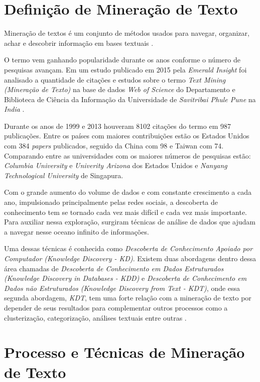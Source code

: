 \documentclass[conference]{IEEEtran}
\begin{document}
\section{Definição de Mineração de Texto}\label{definicao}

Mineração de textos é um conjunto de métodos
usados para navegar, organizar, achar e descobrir
informação em bases textuais \cite{art1}. 

O termo vem ganhando popularidade durante os anos conforme o número de pesquisas avançam.
Em um estudo publicado em 2015 pela \textit{Emerald Insight} foi analisado a quantidade de citações e estudos sobre o termo \textit{Text Mining (Mineração de Texto)} na base de dados \textit{Web of Science} do Departamento e Biblioteca de Ciência da Informação da Universidade de \textit{Savitribai Phule Pune} na \textit{India} \cite{art6}. 

Durante os anos de 1999 e 2013 houveram 8102 citações do termo em 987 publicações. Entre os países com maiores contribuições estão os Estados Unidos com 384 \textit{papers} publicados, seguido da China com 98 e Taiwan com 74. Comparando entre as universidades com os maiores números de pesquisas estão: \textit{Columbia University} e \textit{Univerity Arizona} dos Estados Unidos e \textit{Nanyang Technological University} de Singapura.

Com o grande aumento do volume de dados e com constante crescimento a cada ano, impulsionado principalmente pelas redes sociais, a descoberta de conhecimento tem se tornado cada vez mais difícil e cada vez mais importante. Para auxiliar nessa exploração, surgiram técnicas de análise de dados que ajudam a navegar nesse oceano infinito de informações.

Uma dessas técnicas é conhecida como \textit{Descoberta de Conhecimento Apoiado por Computador (Knowledge Discovery - KD)}. Existem duas abordagens dentro dessa área chamadas de \textit{Descoberta de Conhecimento em Dados Estruturados (Knowledge Discovery in Databases - KDD)} e \textit{Descoberta de Conhecimento em Dados não Estruturados (Knowledge Discovery from Text - KDT)}, onde essa segunda abordagem, \textit{KDT}, tem uma forte relação com a mineração de texto por depender de seus resultados para complementar outros processos como a clusterização, categorização, análises textuais entre outras \cite{art2}.


\section{Processo e Técnicas de Mineração de Texto}\label{tecnicas} 
\end{document}
